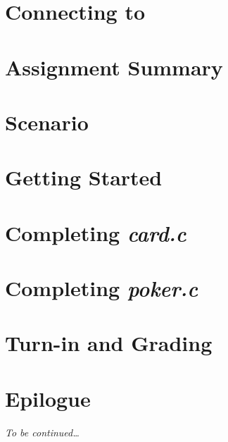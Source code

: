 \documentclass[12pt]{article}
\begin{document}
    \labidentifier


    \section{Connecting to \runtimeenvironment} \label{sec:connecting}  

    \section{Assignment Summary}                                        

    \softwareengineeringfrontmatter

    \section*{Scenario}                                                 \scenariointroduction

    \section{Getting Started} \label{sec:gettingstarted}                

    \section{Completing \textit{card.c}} \label{sec:completingcard}     

    \section{Completing \textit{poker.c}} \label{sec:completingpoker}   

    \section{Turn-in and Grading}                                       

    \section*{Epilogue}                                                 \scenariowrapup

    \textit{To be continued\dots}
\end{document}
